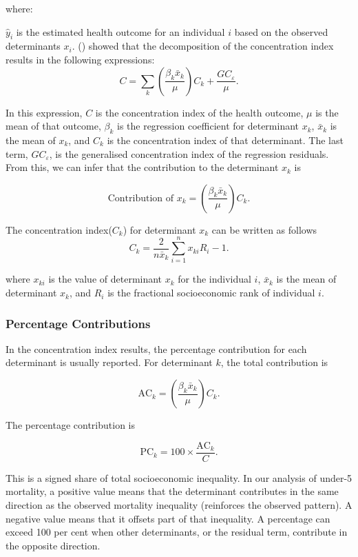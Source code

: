 \documentclass[
  11pt,
  a4paper,
]{article}
\begin{document}
where:

\(\hat{y}_i\) is the estimated health outcome for an individual \(i\)
based on the observed determinants \(x_i\).
() showed that the decomposition of the concentration
index results in the following expressions: \[
C = \sum_k \left( \frac{\beta_k \bar{x}_k}{\mu} \right) C_k + \frac{GC_\varepsilon}{\mu}.
\]

In this expression, \(C\) is the concentration index of the health
outcome, \(\mu\) is the mean of that outcome, \(\beta_k\) is the
regression coefficient for determinant \(x_k\), \(\bar{x}_k\) is the
mean of \(x_k\), and \(C_k\) is the concentration index of that
determinant. The last term, \(GC_\varepsilon\), is the generalised
concentration index of the regression residuals. From this, we can infer
that the contribution to the determinant \(x_k\) is

\[
\text{Contribution of } x_k = \left( \frac{\beta_k \bar{x}_k}{\mu} \right) C_k.
\]

The concentration index(\(C_k\)) for determinant \(x_k\) can be written
as follows \[
C_k = \frac{2}{n\bar{x}_k}\sum_{i=1}^{n}x_{ki}R_i - 1.
\]

where \(x_{ki}\) is the value of determinant \(x_k\) for the individual
\(i\), \(\bar{x}_k\) is the mean of determinant \(x_k\), and \(R_i\) is
the fractional socioeconomic rank of individual \(i\).

\subsubsection{Percentage
Contributions}\label{sec-percentage-contributions}

In the concentration index results, the percentage contribution for each
determinant is usually reported. For determinant \(k\), the total
contribution is

\[
\text{AC}_k = \left(\frac{\beta_k \bar{x}_k}{\mu}\right)C_k.
\]

The percentage contribution is

\[
\text{PC}_k = 100 \times \frac{\text{AC}_k}{C}.
\]

This is a signed share of total socioeconomic inequality. In our
analysis of under-5 mortality, a positive value means that the
determinant contributes in the same direction as the observed mortality
inequality (reinforces the observed pattern). A negative value means
that it offsets part of that inequality. A percentage can exceed 100 per
cent when other determinants, or the residual term, contribute in the
opposite direction.
\end{document}
